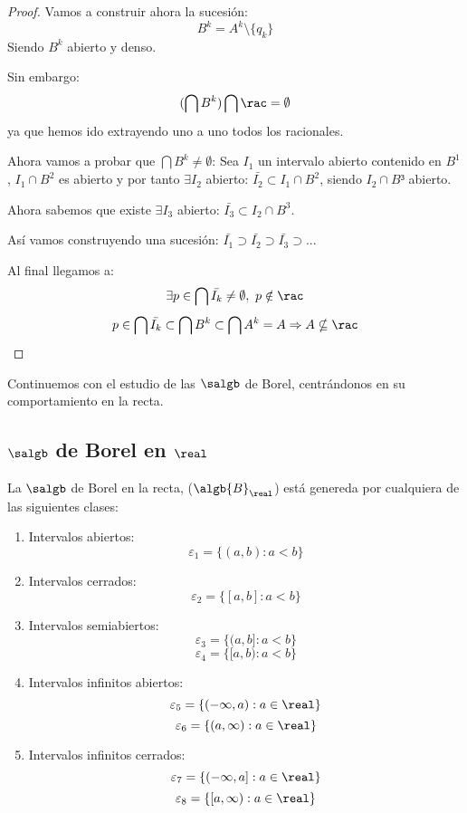 \documentclass{apuntes}
\begin{document}
\begin{example}
\begin{itemize}
\begin{proof}
Vamos a construir ahora la sucesión:
\[B^k=A^k\setminus \{q_k\}\]
Siendo $B^k$ abierto y denso.

Sin embargo:
\[(\bigcap B^k)\bigcap \rac = \emptyset\]
ya que hemos ido extrayendo uno a uno todos los racionales.

Ahora vamos a probar que $\bigcap B^k \neq \emptyset$:
Sea $I_1$ un intervalo abierto contenido en $B^1$, $I_1\cap B^2$ es abierto y por tanto $\exists I_2$ abierto: $\bar{I_2} \subset I_1 \cap B^2$, siendo $I_2 \cap B³$ abierto.

Ahora sabemos que existe $\exists I_3$ abierto: $\bar{I_3} \subset I_2 \cap B^3$.

Así vamos construyendo una sucesión: $\bar{I_1}\supset\bar{I_2}\supset\bar{I_3}\supset...$

Al final llegamos a:
\[\exists p \in \bigcap \bar{I_k} \neq \emptyset, \ p \notin \rac\]
\[p \in \bigcap \bar{I_k} \subset \bigcap B^k \subset \bigcap A^k = A \Rightarrow A\nsubseteq \rac\]

\end{proof}
\end{itemize}
\end{example}

Continuemos con el estudio de las $\salgb$ de Borel, centrándonos en su comportamiento en la recta.

\subsection{$\salgb$ de Borel en $\real$}
\begin{theorem}
La $\salgb$ de Borel en la recta, ($\algb{B}_\real$) está genereda por cualquiera de las siguientes clases:
\begin{enumerate}
\item Intervalos abiertos:
\[\varepsilon_1=\lbrace (a,b): a < b\rbrace\]
\item Intervalos cerrados:
\[\varepsilon_2=\lbrace [a,b]: a < b\rbrace\]
\item Intervalos semiabiertos:
\[\varepsilon_3=\lbrace (a,b]: a < b\rbrace\]
\[\varepsilon_4=\lbrace [a,b): a < b\rbrace\]

\item Intervalos infinitos abiertos:
\[\varepsilon_5=\lbrace (-\infty,a): a \in \real \rbrace\]
\[\varepsilon_6=\lbrace (a, \infty): a \in \real \rbrace\]

\item Intervalos infinitos cerrados:
\[\varepsilon_7=\lbrace (-\infty,a]: a \in \real \rbrace\]
\[\varepsilon_8=\lbrace [a, \infty): a \in \real \rbrace\]
\end{enumerate}
\end{theorem}
\end{document}
